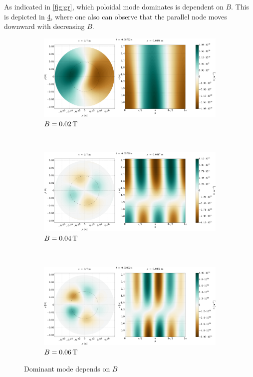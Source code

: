 %
As indicated in \cref{fig:gr}, which poloidal mode dominates is dependent on $B$.
This is depicted in \cref{fig:dominatingMode}, where one also can observe that the parallel node moves downward with decreasing $B$.
%
\begin{figure}[htbp]
    \centering
    \begin{subfigure}[h]{1.00\textwidth}
        \centering
        \includegraphics[width=1.0\textwidth]{fig/results/modesDiffScanVals/B002}
        \caption{$B=0.02 \, \text{T}$}
        \label{fig:B002}
    \end{subfigure}%
    \\
    \begin{subfigure}[h]{1.00\textwidth}
        \centering
        \includegraphics[width=1.0\textwidth]{fig/results/modesDiffScanVals/B004}
        \caption{$B=0.04 \, \text{T}$}
        \label{fig:B004}
    \end{subfigure}
    \\
    \begin{subfigure}[h]{1.00\textwidth}
        \centering
        \includegraphics[width=1.0\textwidth]{fig/results/modesDiffScanVals/B006}
        \caption{$B=0.06 \, \text{T}$}
        \label{fig:B006}
    \end{subfigure}
    \caption{Dominant mode depends on $B$}
    \label{fig:dominatingMode}
\end{figure}
%
\FloatBarrier

